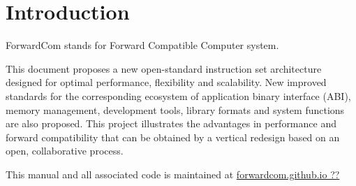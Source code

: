 \documentclass[forwardcom.tex]{subfiles}
\begin{document}
\RaggedRight

\chapter{Introduction}
ForwardCom stands for Forward Compatible Computer system.

This document proposes a new open-standard instruction set architecture designed for optimal performance, flexibility and scalability. New improved standards for the corresponding ecosystem of application binary interface (ABI), memory management, development tools, library formats and system functions are also proposed. This project illustrates the advantages in performance and forward compatibility that can be obtained by a vertical redesign based on an open, collaborative process.
\vspace{2mm}

This manual and all associated code is maintained at 
\href{http://forwardcom.github.io}{forwardcom.github.io ??}

 
\end{document}
